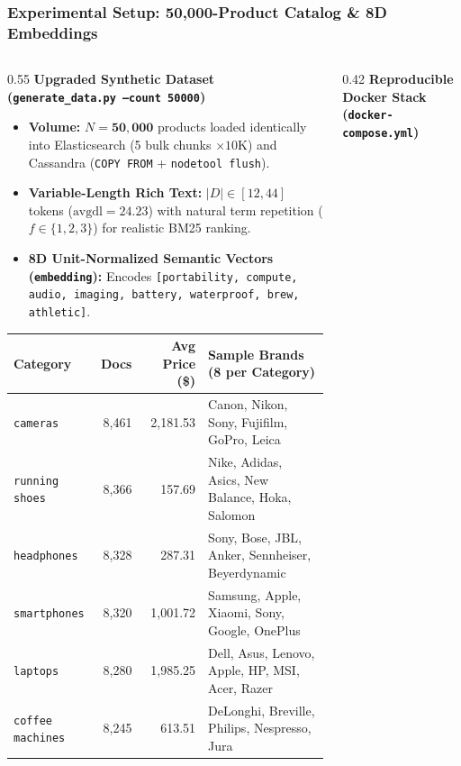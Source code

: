 \documentclass[aspectratio=169]{beamer}
\begin{document}
\begin{frame}
\frametitle{Experimental Setup: 50,000-Product Catalog \& 8D Embeddings}
\begin{columns}[T]
\begin{column}{0.55\textwidth}
\textbf{\scriptsize Upgraded Synthetic Dataset (\texttt{generate\_data.py --count 50000})}
\scriptsize
\begin{itemize}
    \item \textbf{Volume:} $N = \mathbf{50,000}$ products loaded identically into Elasticsearch (5 bulk chunks $\times 10\text{K}$) and Cassandra (\texttt{COPY FROM} + \texttt{nodetool flush}).
    \item \textbf{Variable-Length Rich Text:} $|D| \in [12, 44]$ tokens ($\text{avgdl} = 24.23$) with natural term repetition ($f \in \{1,2,3\}$) for realistic BM25 ranking.
    \item \textbf{8D Unit-Normalized Semantic Vectors (\texttt{embedding}):} Encodes \texttt{[portability, compute, audio, imaging, battery, waterproof, brew, athletic]}.
\end{itemize}
\vspace{0.03cm}
\centering
\tiny
\begin{tabular}{lrrl}
\toprule
\textbf{Category} & \textbf{Docs} & \textbf{Avg Price (\$)} & \textbf{Sample Brands (8 per Category)} \\
\midrule
\texttt{cameras}         & 8,461 & 2,181.53 & Canon, Nikon, Sony, Fujifilm, GoPro, Leica \\
\texttt{running shoes}   & 8,366 &   157.69 & Nike, Adidas, Asics, New Balance, Hoka, Salomon \\
\texttt{headphones}      & 8,328 &   287.31 & Sony, Bose, JBL, Anker, Sennheiser, Beyerdynamic \\
\texttt{smartphones}     & 8,320 & 1,001.72 & Samsung, Apple, Xiaomi, Sony, Google, OnePlus \\
\texttt{laptops}         & 8,280 & 1,985.25 & Dell, Asus, Lenovo, Apple, HP, MSI, Acer, Razer \\
\texttt{coffee machines} & 8,245 &   613.51 & DeLonghi, Breville, Philips, Nespresso, Jura \\
\bottomrule
\end{tabular}
\end{column}
\begin{column}{0.42\textwidth}
\textbf{\scriptsize Reproducible Docker Stack (\texttt{docker-compose.yml})}
\vspace{0.08cm}
\centering
\begin{tikzpicture}[scale=0.73, transform shape,
  cbox/.style={rectangle, draw=BKTemplate, thick, fill=codebg, rounded corners=3pt, minimum width=5.6cm, minimum height=0.92cm, align=center, font=\scriptsize}]
  

\end{tikzpicture}
\end{column}
\end{columns}
\end{frame}
\end{document}
